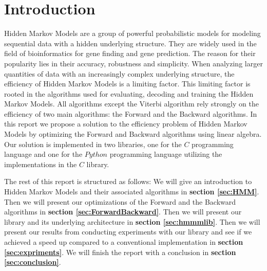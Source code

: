\section{Introduction}
Hidden Markov Models\cite{baum1966} are a group of powerful probabilistic models for modeling sequential data with a hidden underlying structure. They are widely used in the field of bioinformatics for gene finding and gene prediction. The reason for their popularity lies in their accuracy, robustness and simplicity.
When analyzing larger quantities of data with an increasingly complex underlying structure, the efficiency of Hidden Markov Models is a limiting factor. This limiting factor is rooted in the algorithms used for evaluating, decoding and training the Hidden Markov Models. All algorithms except the Viterbi algorithm rely strongly on the efficiency of two main algorithms: the Forward and the Backward algorithms.
In this report we propose a solution to the efficiency problem of Hidden Markov Models by optimizing the Forward and Backward algorithms using linear algebra. Our solution is implemented in two libraries, one for the $C$ programming language and one for the $Python$ programming language utilizing the implementations in the $C$ library.

{\small The rest of this report is structured as follows: We will give an introduction to Hidden Markov Models and their associated algorithms in \textbf{section \ref{sec:HMM}}. Then we will present our optimizations of the Forward and the Backward algorithms in \textbf{section \ref{sec:ForwardBackward}}. Then we will present our library and its underlying architecture in \textbf{section \ref{sec:hmmmlib}}. Then we will present our results from conducting experiments with our library and see if we achieved a speed up compared to a conventional implementation in \textbf{section \ref{sec:expriments}}. We will finish the report with a conclusion in \textbf{section \ref{sec:conclusion}}.}

